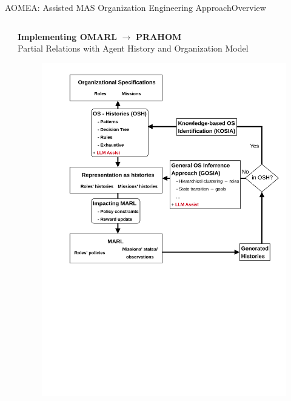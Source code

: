 \begin{frame}{AOMEA: Assisted MAS Organization Engineering Approach}{Overview}
\begin{columns}
\begin{column}{0.5\textwidth}
        \end{column}

        \hspace{-5ex}
        \begin{column}{0.5\textwidth}
            {\small \textbf{Implementing OMARL} $\rightarrow$ \textbf{PRAHOM} \\ { \footnotesize Partial Relations with Agent History and Organization Model}}

            \centering
            \begin{figure}
                \vspace{-4ex}
                \includegraphics[width=1.1\linewidth]{figures/prahom_overview.png}
            \end{figure}

        \end{column}

    \end{columns}

\end{frame}



